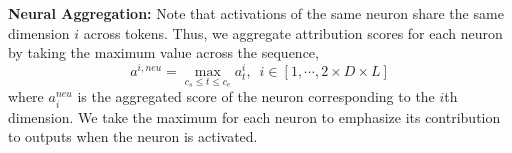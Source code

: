 \vspace{1mm}
\noindent\textbf{Neural Aggregation:}
Note that activations of the same neuron share the same dimension $i$ across tokens.
Thus, we aggregate attribution scores for each neuron by taking the maximum value across the sequence,
%
\begin{equation}
    a^{i,neu} = \max_{c_s\leq t \leq c_e} a^i_t, \,\,\,i\in [1, \cdots, 2\times D\times L]
\end{equation}
%
where $a_i^{neu}$ is the aggregated score of the neuron corresponding to the $i$th dimension.
We take the maximum for each neuron to emphasize its contribution to outputs when the neuron is activated.




